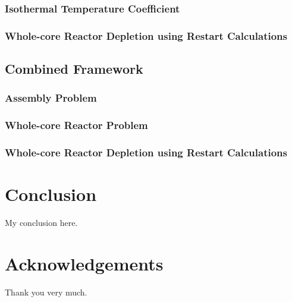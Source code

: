 \documentclass[11pt,a4paper,onecolumn,oneside]{report}
\begin{document}
\subsubsection{Isothermal Temperature Coefficient}
\subsubsection{Whole-core Reactor Depletion using Restart Calculations}

\subsection{Combined Framework}
\subsubsection{Assembly Problem}
\subsubsection{Whole-core Reactor Problem}
\subsubsection{Whole-core Reactor Depletion using Restart Calculations}


\newpage 
\section{Conclusion} 
My conclusion here.

\clearpage



\clearpage

\section*{\hfill \Large Acknowledgements \hfill}
Thank you very much.
\clearpage


\hbox{ }
\thispagestyle{empty}
\clearpage
\end{document}
